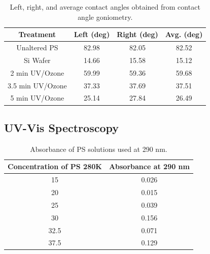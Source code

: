 \documentclass[twocolumn]{article}
\begin{document}
                \begin{table}
                    \centering
                    \caption{Left, right, and average contact angles obtained from contact angle goniometry.}\label{tab:contact}
                    \begin{tabular}{@{}cccc@{}}
                        \toprule
                        Treatment                & Left (deg) & Right (deg) & Avg. (deg) \\ \midrule
                        Unaltered PS    & 82.98          & 82.05           & 82.52             \\
                        Si Wafer            & 14.66          & 15.58           & 15.12             \\
                        2 min UV/Ozone   & 59.99          & 59.36           & 59.68             \\
                        3.5 min UV/Ozone & 37.33          & 37.69           & 37.51             \\
                        5 min UV/Ozone   & 25.14          & 27.84           & 26.49             \\ \bottomrule
                        \end{tabular}
                \end{table}
            
            \subsection{UV-Vis Spectroscopy}

                \begin{table}
                    \centering
                    \caption{Absorbance of PS solutions used at 290 nm.}\label{tab:abs}
                    \begin{tabular}{@{}cc@{}}
                        \toprule
                        Concentration of PS 280K & Absorbance at 290 nm \\ \midrule
                        15                                & 0.026                \\
                        20                                & 0.015                \\
                        25                                & 0.039                \\
                        30                                & 0.156                \\
                        32.5                              & 0.071                \\
                        37.5                              & 0.129                \\ \bottomrule
                    \end{tabular}
                \end{table}
\end{document}
